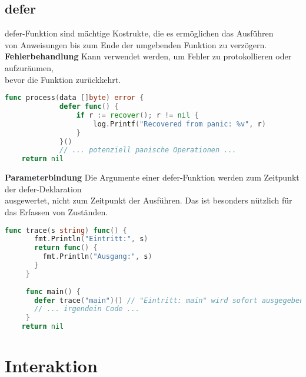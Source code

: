 \documentclass[twoside,a4paper,12pt]{article}
\begin{document}
\subsection{defer}
defer-Funktion sind mächtige Kostrukte, die es ermöglichen das Ausführen \\ 
von Anweisungen bis zum Ende der umgebenden Funktion zu verzögern. \\
\textbf{Fehlerbehandlung}
Kann verwendet werden, um Fehler zu protokollieren oder aufzuräumen, \\ 
bevor die Funktion zurückkehrt.
\begin{center}
  \begin{minipage}{1.0\textwidth}
    \begin{lstlisting}[language=Go]
		 func process(data []byte) error {
		     defer func() {
		         if r := recover(); r != nil {
		             log.Printf("Recovered from panic: %v", r)
		         }
		     }()
		     // ... potenziell panische Operationen ...
    return nil
    \end{lstlisting}
  \end{minipage}
\end{center}
\textbf{Parameterbindung}
Die Argumente einer defer-Funktion werden zum Zeitpunkt der defer-Deklaration \\ 
ausgewertet, nicht zum Zeitpunkt der Ausführen. Das ist besonders nützlich für \\ 
das Erfassen von Zuständen.
\begin{center}
  \begin{minipage}{1.0\textwidth}
    \begin{lstlisting}[language=Go]
 		 func trace(s string) func() {
       fmt.Println("Eintritt:", s)
       return func() {
         fmt.Println("Ausgang:", s)
       }
     }
 
     func main() {
       defer trace("main")() // "Eintritt: main" wird sofort ausgegeben, "Ausgang: main" am Ende
       // ... irgendein Code ...
     }
    return nil
    \end{lstlisting}
  \end{minipage}
\end{center}

\newpage
\section{Interaktion}
\end{document}
